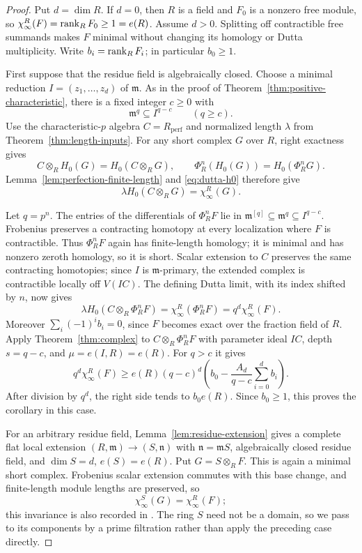 \begin{proof}
Put $d=\dim R$.  If $d=0$, then $R$ is a field and $F_0$ is a
nonzero free module, so $\chi_\infty^R(F)=\operatorname{rank}_R F_0\geq1=e(R)$.
Assume $d>0$.  Splitting off contractible free summands makes $F$
minimal without changing its homology or Dutta multiplicity.
Write $b_i=\operatorname{rank}_R F_i$; in particular $b_0\geq1$.

First suppose that the residue field is algebraically closed.  Choose
a minimal reduction $I=(z_1,\ldots,z_d)$ of $\mathfrak m$.  As in the
proof of Theorem~\ref{thm:positive-characteristic}, there is a fixed
integer $c\geq0$ with
\[
                 \mathfrak m^q\subseteq I^{q-c}\qquad(q\geq c).
\]
Use the characteristic-$p$ algebra $C=R_{\mathrm{perf}}$ and normalized
length $\lambda$ from Theorem~\ref{thm:length-inputs}.  For any short
complex $G$ over $R$, right exactness gives
\[
 C\otimes_R H_0(G)=H_0(C\otimes_R G),\qquad
 \Phi_R^n(H_0(G))=H_0(\Phi_R^nG).
\]
Lemma~\ref{lem:perfection-finite-length} and
\eqref{eq:dutta-h0} therefore give
\[
                  \lambda H_0(C\otimes_R G)=\chi_\infty^R(G).
\]

Let $q=p^n$.  The entries of the differentials of $\Phi_R^nF$ lie
in $\mathfrak m^{[q]}\subseteq\mathfrak m^q\subseteq I^{q-c}$.
Frobenius preserves a contracting homotopy at every localization
where $F$ is contractible.  Thus $\Phi_R^nF$ again has finite-length
homology; it is minimal and has nonzero zeroth homology, so it is
short.  Scalar extension to $C$ preserves the same contracting
homotopies; since $I$ is $\mathfrak m$-primary, the extended complex
is contractible locally off $V(IC)$.  The defining Dutta limit, with
its index shifted by $n$, now gives
\[
 \lambda H_0(C\otimes_R\Phi_R^nF)
   =\chi_\infty^R(\Phi_R^nF)=q^d\chi_\infty^R(F).
\]
Moreover $\sum_i(-1)^ib_i=0$, since $F$ becomes exact over the
fraction field of $R$.  Apply Theorem~\ref{thm:complex} to
$C\otimes_R\Phi_R^nF$ with parameter ideal $IC$, depth $s=q-c$,
and $\mu=e(I,R)=e(R)$.  For $q>c$ it gives
\[
 q^d\chi_\infty^R(F)
 \geq e(R)(q-c)^d
       \left(b_0-\frac{A_d}{q-c}\sum_{i=0}^d b_i\right).
\]
After division by $q^d$, the right side tends to $b_0e(R)$.
Since $b_0\geq1$, this proves the corollary in this case.

For an arbitrary residue field, Lemma~\ref{lem:residue-extension}
gives a complete flat local extension
$(R,\mathfrak m)\to(S,\mathfrak n)$ with
$\mathfrak n=\mathfrak mS$, algebraically closed residue field, and
$\dim S=d$, $e(S)=e(R)$.  Put $G=S\otimes_R F$.  This is again a
minimal short complex.  Frobenius scalar extension commutes with
this base change, and finite-length module lengths are preserved,
so
\[
             \chi_\infty^S(G)=\chi_\infty^R(F);
\]
this invariance is also recorded in \cite[Section~4.17]{IMW2022}.
The ring $S$ need not be a domain, so we pass to its components by
a prime filtration rather than apply the preceding case directly.


\end{proof}
